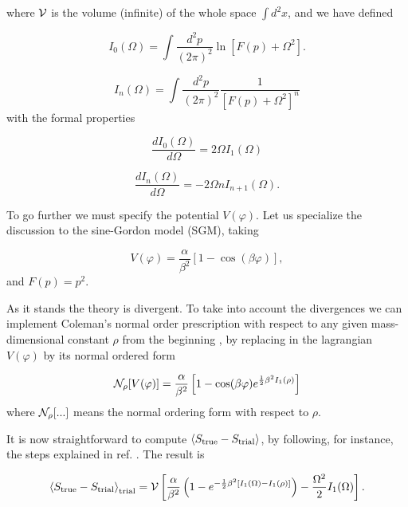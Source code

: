 \documentclass[a4paper,12pt]{article}
\begin{document}
\noindent where $\mathcal{V}$ is the volume (infinite) of the whole space
$\int d^2x$, and we have defined

\begin{equation}
I_0(\Omega)=\int \frac{d^2p}{(2\pi)^2} \ln[F(p)+\Omega^2].
\end{equation}

\begin{equation}
I_n(\Omega)=\int \frac{d^2p}{(2\pi)^2} \frac{1}{[F(p)+\Omega^2]^n}
\end{equation}
with the formal properties

\begin{equation}
\frac{dI_0(\Omega)}{d\Omega}=2\Omega I_1(\Omega)
\end{equation}

\begin{equation}
\frac{dI_n(\Omega)}{d\Omega}=-2\Omega n I_{n+1}(\Omega).
\end{equation}

To go further we must specify the potential $V(\varphi)$. Let us specialize the
discussion to the sine-Gordon model (SGM), taking

\begin{equation}
V(\varphi)=\frac{\alpha}{\beta^2}\left[1-\cos(\beta\varphi)\right],
\end{equation}
and $F(p)=p^2$.

As it stands the theory is divergent. To take into account the divergences we can
implement Coleman's normal order prescription \cite{Coleman} with respect to any given
mass-dimensional constant $\rho$ from the beginning \cite{beg}, by replacing in the
lagrangian $V(\varphi)$ by its normal ordered form

\begin{equation}
\mathcal{N}_\rho[V(\varphi)]=\frac{\alpha}{\beta^2}\left[1-\cos(\beta\varphi)e^{{\scriptstyle\frac{1}{2}}\beta^2
I_1(\rho)}\right]
\end{equation}
where $\mathcal{N}_\rho[...]$ means the normal ordering form with respect
to $\rho$.

It is now straightforward to compute $\langle S_{\text{true}}-S_{\text{trial}}
\rangle$, by following, for instance, the steps explained in ref.
\cite{Li-Naon}. The result is

\begin{equation}\label{elegant}
\left\langle S_{\text{true}}-S_{\text{trial}} \right\rangle_{\text{trial}} =
\mathcal{V}\left[\frac{\alpha}{\beta^2}\left(1-e^{-{\scriptstyle\frac{1}{2}}\beta^2[I_1(\Omega)-I_1(\rho)]}\right)
-\frac{\Omega^2}{2}I_1(\Omega)\right].
\end{equation}
\end{document}
